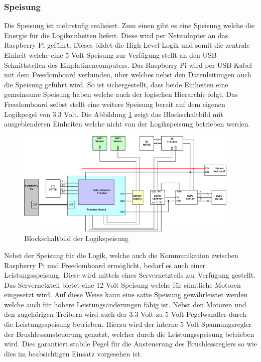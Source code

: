\subsubsection{Speisung}

Die Speisung ist mehrstufig realisiert. Zum einen gibt es eine Speisung
welche die Energie für die Logikeinheiten liefert. Diese wird per Netzadapter
an das Raspberry Pi geführt. Dieses bildet die High-Level-Logik und somit die
zentrale Einheit welche eine 5 Volt Speisung zur Verfügung stellt an den
USB-Schnittstellen des Einplatinencomputers. Das Raspberry Pi wird per
USB-Kabel mit dem Freedomboard verbunden, über welches nebst den
Datenleitungen auch die Speisung geführt wird. So ist sichergestellt,
dass beide Einheiten eine gemeinsame Speisung haben welche auch der
logischen Hierarchie folgt. Das Freedomboard selbst stellt eine weitere
Speisung bereit auf dem eigenen Logikpegel von 3.3 Volt. Die Abbildung
\ref{fig:et-block_logic} zeigt das Blockschaltbild mit ausgeblendeten
Einheiten welche nicht von der Logikspeisung betrieben werden.

\begin{figure}[h!]
	\centering
	\includegraphics[width=0.95\textwidth]{../../fig/blockdiagram_logic.pdf}
	\caption{Blockschaltbild der Logikspeisung}
	\label{fig:et-block_logic}
\end{figure}

Nebst der Speisung für die Logik, welche auch die Kommunikation zwischen
Raspberry Pi und Freedomboard ermöglicht, bedarf es auch einer
Leistungsspeisung. Diese wird mittels eines Servernetzteils zur Verfügung
gestellt. Das Servernetzteil bietet eine 12 Volt Speisung welche für sämtliche
Motoren eingesetzt wird. Auf diese Weise kann eine satte Speisung
gewährleistet werden welche auch für höhere Leistungsänderungen fähig ist.
Nebst den Motoren und den zugehörigen Treibern wird auch der 3.3 Volt zu 
5 Volt Pegelwandler durch die Leistungsspeisung betrieben. Hierzu wird der
interne 5 Volt Spannungsregler der Brushlessansteuerung genutzt, welcher durch
die Leistungsspeisung betrieben wird. Dies garantiert stabile Pegel für die
Ansteuerung des Brushlessreglers so wie dies im beabsichtigen Einsatz
vorgesehen ist.



